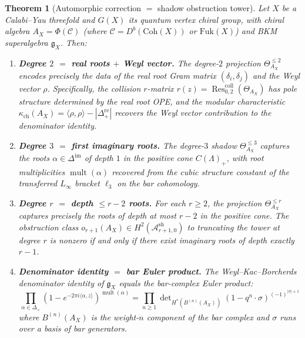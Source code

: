 \documentclass[11pt]{amsart}
\newtheorem{theorem}{Theorem}[section]
\theoremstyle{definition}
\theoremstyle{remark}
\DeclareMathOperator{\mult}{mult}
\DeclareMathOperator{\Res}{Res}
\newcommand{\cA}{\mathcal{A}}
\newcommand{\cC}{\mathcal{C}}
\newcommand{\fg}{\mathfrak{g}}
\begin{document}
\begin{theorem}[Automorphic correction $=$ shadow obstruction tower]
\label{thm:main}
Let $X$ be a Calabi--Yau threefold and $G(X)$ its quantum vertex
chiral group, with chiral algebra $A_X = \Phi(\cC)$ (where
$\cC = D^b(\mathrm{Coh}(X))$ or $\mathrm{Fuk}(X)$) and BKM
superalgebra $\fg_X$. Then:
\begin{enumerate}[label=(\alph*)]
 \item \textbf{Degree $2$ $=$ real roots $+$ Weyl vector.}
 The degree-$2$ projection $\Theta^{\leq 2}_{A_X}$ encodes
 precisely the data of the real root Gram matrix
 $(\delta_i, \delta_j)$ and the Weyl vector $\rho$.
 Specifically, the collision $r$-matrix
 $r(z) = \Res^{\mathrm{coll}}_{0,2}(\Theta_{A_X})$ has
 pole structure determined by the real root OPE, and the
 modular characteristic
 $\kappa_{\mathrm{ch}}(A_X) = \langle \rho, \rho \rangle - |\Delta^{\mathrm{re}}_+|$
 recovers the Weyl vector contribution to the denominator
 identity.

 \item \textbf{Degree $3$ $=$ first imaginary roots.}
 The degree-$3$ shadow $\Theta^{\leq 3}_{A_X}$ captures the
 roots $\alpha \in \Delta^{\mathrm{im}}$ of depth $1$ in the
 positive cone $C(\Lambda)_+$, with root multiplicities
 $\mult(\alpha)$ recovered from the cubic structure constant
 of the transferred $L_\infty$ bracket $\ell_3$ on the bar
 cohomology.

 \item \textbf{Degree $r$ $=$ depth $\leq r-2$ roots.}
 For each $r \geq 2$, the projection
 $\Theta^{\leq r}_{A_X}$ captures precisely the roots of
 depth at most $r - 2$ in the positive cone. The obstruction
 class $o_{r+1}(A_X) \in H^2(\cA^{\mathrm{sh}}_{r+1,0})$
 to truncating the tower at degree $r$ is nonzero if and only
 if there exist imaginary roots of depth exactly $r - 1$.

 \item \textbf{Denominator identity $=$ bar Euler product.}
 The Weyl--Kac--Borcherds denominator identity of $\fg_X$
 equals the bar-complex Euler product:
 \begin{equation}\label{eq:denom-bar}
 \prod_{\alpha \in \Delta_+}
 (1 - e^{-2\pi i \langle \alpha, z \rangle})^{\mult(\alpha)}
 = \prod_{n \geq 1}
 \det\nolimits_{H^*(B^{(n)}(A_X))}
 (1 - q^n \cdot \sigma)^{(-1)^{|\sigma|+1}}
 \end{equation}
 where $B^{(n)}(A_X)$ is the weight-$n$ component of the bar
 complex and $\sigma$ runs over a basis of bar generators.
\end{enumerate}
\end{theorem}
\end{document}
